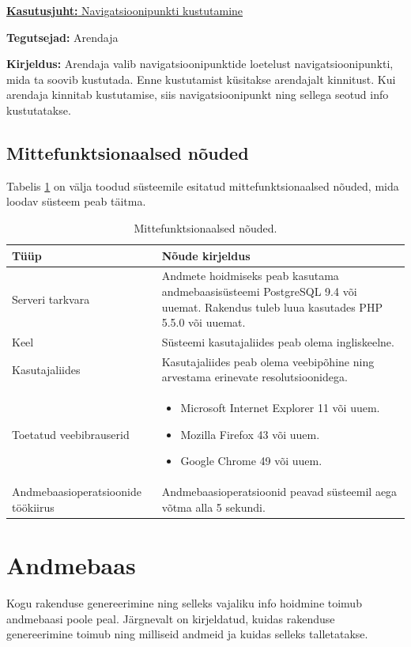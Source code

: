 \documentclass[a4paper,12pt]{article} %
\begin{document}
\underline{\textbf{Kasutusjuht:} Navigatsioonipunkti kustutamine}
\par
\textbf{Tegutsejad:} Arendaja
\par
\textbf{Kirjeldus:} Arendaja valib navigatsioonipunktide loetelust navigatsioonipunkti, mida ta soovib kustutada. Enne kustutamist küsitakse arendajalt kinnitust. Kui arendaja kinnitab kustutamise, siis navigatsioonipunkt ning sellega seotud info kustutatakse.
\par

\subsection{Mittefunktsionaalsed nõuded}
Tabelis \ref{mittefunktsionaalsed_nõuded} on välja toodud süsteemile esitatud mittefunktsionaalsed nõuded, mida loodav süsteem peab täitma.
\begin{table}[H]%
\begin{center}
\caption{Mittefunktsionaalsed nõuded.}
\label{mittefunktsionaalsed_nõuded}
\begin{tabular}{|p{5cm}|p{10cm}|}
\hline
\rowcolor{rowgray}
Tüüp & Nõude kirjeldus \\ \hline
Serveri tarkvara & Andmete hoidmiseks peab kasutama andmebaasisüsteemi PostgreSQL 9.4 või uuemat. Rakendus tuleb luua kasutades PHP 5.5.0 või uuemat. \\ \hline
Keel & Süsteemi kasutajaliides peab olema ingliskeelne. \\ \hline
Kasutajaliides & Kasutajaliides peab olema veebipõhine ning arvestama erinevate resolutsioonidega. \\ \hline
Toetatud veebibrauserid & 
\begin{itemize}
\item Microsoft Internet Explorer 11 või uuem.
\item Mozilla Firefox 43 või uuem.
\item Google Chrome 49 või uuem.
\end{itemize}
 \\ \hline
Andmebaasioperatsioonide töökiirus & Andmebaasioperatsioonid peavad süsteemil aega võtma alla 5 sekundi. \\ \hline
\end{tabular}
\end{center}
\end{table}

\section{Andmebaas}
Kogu rakenduse genereerimine ning selleks vajaliku info hoidmine toimub andmebaasi poole peal. Järgnevalt on kirjeldatud, kuidas rakenduse genereerimine toimub ning milliseid andmeid ja kuidas selleks talletatakse.
\end{document}
